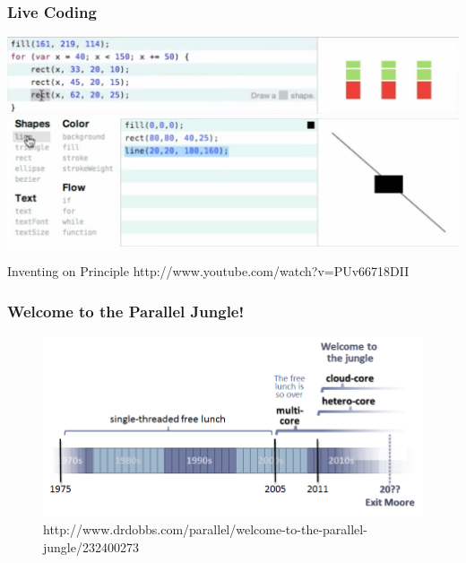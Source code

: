 \documentclass[12pt]{beamer}
\begin{document}
\begin{frame}
\frametitle{Live Coding}
\includegraphics[width=\textwidth]{img/livecoding1}
\vspace{12pt}
\pause
\includegraphics[width=\textwidth]{img/livecoding2}
\pause
\begin{block}{Inventing on Principle}
http://www.youtube.com/watch?v=PUv66718DII
\end{block}
\end{frame}

\begin{frame}
\frametitle{Welcome to the Parallel Jungle!}
\begin{figure}
\includegraphics[width=\textwidth]{img/sutter.png}
\caption{http://www.drdobbs.com/parallel/welcome-to-the-parallel-jungle/232400273}
\end{figure}
\end{frame}
\end{document}
